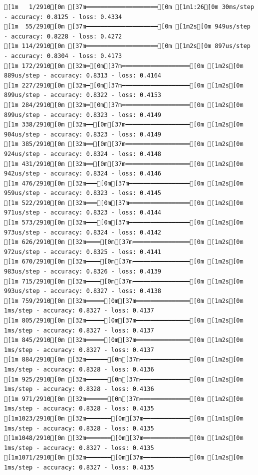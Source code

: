\documentclass[
  letterpaper,
  DIV=11,
  numbers=noendperiod]{scrartcl}
\begin{document}
\begin{verbatim}
[1m   1/2910[0m [37m━━━━━━━━━━━━━━━━━━━━[0m [1m1:26[0m 30ms/step - accuracy: 0.8125 - loss: 0.4334
[1m  55/2910[0m [37m━━━━━━━━━━━━━━━━━━━━[0m [1m2s[0m 949us/step - accuracy: 0.8228 - loss: 0.4272 
[1m 114/2910[0m [37m━━━━━━━━━━━━━━━━━━━━[0m [1m2s[0m 897us/step - accuracy: 0.8304 - loss: 0.4173
[1m 172/2910[0m [32m━[0m[37m━━━━━━━━━━━━━━━━━━━[0m [1m2s[0m 889us/step - accuracy: 0.8313 - loss: 0.4164
[1m 227/2910[0m [32m━[0m[37m━━━━━━━━━━━━━━━━━━━[0m [1m2s[0m 899us/step - accuracy: 0.8322 - loss: 0.4153
[1m 284/2910[0m [32m━[0m[37m━━━━━━━━━━━━━━━━━━━[0m [1m2s[0m 899us/step - accuracy: 0.8323 - loss: 0.4149
[1m 338/2910[0m [32m━━[0m[37m━━━━━━━━━━━━━━━━━━[0m [1m2s[0m 904us/step - accuracy: 0.8323 - loss: 0.4149
[1m 385/2910[0m [32m━━[0m[37m━━━━━━━━━━━━━━━━━━[0m [1m2s[0m 924us/step - accuracy: 0.8324 - loss: 0.4148
[1m 431/2910[0m [32m━━[0m[37m━━━━━━━━━━━━━━━━━━[0m [1m2s[0m 942us/step - accuracy: 0.8324 - loss: 0.4146
[1m 476/2910[0m [32m━━━[0m[37m━━━━━━━━━━━━━━━━━[0m [1m2s[0m 959us/step - accuracy: 0.8323 - loss: 0.4145
[1m 522/2910[0m [32m━━━[0m[37m━━━━━━━━━━━━━━━━━[0m [1m2s[0m 971us/step - accuracy: 0.8323 - loss: 0.4144
[1m 573/2910[0m [32m━━━[0m[37m━━━━━━━━━━━━━━━━━[0m [1m2s[0m 973us/step - accuracy: 0.8324 - loss: 0.4142
[1m 626/2910[0m [32m━━━━[0m[37m━━━━━━━━━━━━━━━━[0m [1m2s[0m 972us/step - accuracy: 0.8325 - loss: 0.4141
[1m 670/2910[0m [32m━━━━[0m[37m━━━━━━━━━━━━━━━━[0m [1m2s[0m 983us/step - accuracy: 0.8326 - loss: 0.4139
[1m 715/2910[0m [32m━━━━[0m[37m━━━━━━━━━━━━━━━━[0m [1m2s[0m 993us/step - accuracy: 0.8327 - loss: 0.4138
[1m 759/2910[0m [32m━━━━━[0m[37m━━━━━━━━━━━━━━━[0m [1m2s[0m 1ms/step - accuracy: 0.8327 - loss: 0.4137  
[1m 805/2910[0m [32m━━━━━[0m[37m━━━━━━━━━━━━━━━[0m [1m2s[0m 1ms/step - accuracy: 0.8327 - loss: 0.4137
[1m 845/2910[0m [32m━━━━━[0m[37m━━━━━━━━━━━━━━━[0m [1m2s[0m 1ms/step - accuracy: 0.8327 - loss: 0.4137
[1m 884/2910[0m [32m━━━━━━[0m[37m━━━━━━━━━━━━━━[0m [1m2s[0m 1ms/step - accuracy: 0.8328 - loss: 0.4136
[1m 925/2910[0m [32m━━━━━━[0m[37m━━━━━━━━━━━━━━[0m [1m2s[0m 1ms/step - accuracy: 0.8328 - loss: 0.4136
[1m 971/2910[0m [32m━━━━━━[0m[37m━━━━━━━━━━━━━━[0m [1m2s[0m 1ms/step - accuracy: 0.8328 - loss: 0.4135
[1m1023/2910[0m [32m━━━━━━━[0m[37m━━━━━━━━━━━━━[0m [1m1s[0m 1ms/step - accuracy: 0.8328 - loss: 0.4135
[1m1048/2910[0m [32m━━━━━━━[0m[37m━━━━━━━━━━━━━[0m [1m2s[0m 1ms/step - accuracy: 0.8327 - loss: 0.4135
[1m1071/2910[0m [32m━━━━━━━[0m[37m━━━━━━━━━━━━━[0m [1m2s[0m 1ms/step - accuracy: 0.8327 - loss: 0.4135

\end{verbatim}
\end{document}
